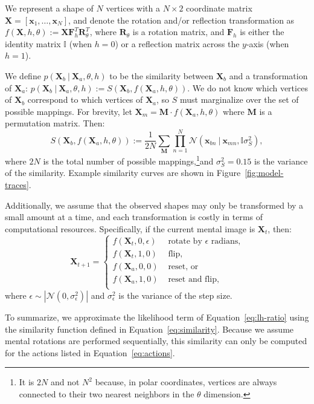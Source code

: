 \documentclass[10pt,letterpaper]{article}
\newcommand{\Xa}[0]{\mathbf{X}_a}
\newcommand{\Xb}[0]{\mathbf{X}_b}
\newcommand{\Xt}[0]{\mathbf{X}_t}
\newcommand{\R}[0]{\mathbf{R}_\theta}
\newcommand{\F}[0]{\mathbf{F}}
\newcommand{\M}[0]{\mathbf{M}}
\newcommand{\I}[0]{\mathbb{I}}
\newcommand{\hi}[0]{h=0}
\newcommand{\hf}[0]{h=1}
\begin{document}
We represent a shape of $N$ vertices with a $N\times 2$ coordinate
matrix $\mathbf{X}=[\mathbf{x}_1, \ldots{}, \mathbf{x}_N]$, and denote
the rotation and/or reflection transformation as $f(\mathbf{X}, h,
\theta):=\mathbf{X}\F_h^T\R^T$, where $\R$ is a rotation matrix, and
$\F_h$ is either the identity matrix $\I$ (when $\hi$) or a reflection
matrix across the $y$-axis (when $\hf$).

We define $p(\Xb\ \vert\ \Xa, \theta, h)$ to be the similarity between
$\Xb$ and a transformation of $\Xa$: $p(\Xb\ \vert\ \Xa, \theta, h):=
S(\Xb, f(\Xa, h, \theta))$.  We do not know which vertices of $\Xb$
correspond to which vertices of $\Xa$, so $S$ must marginalize over
the set of possible mappings. For brevity, let
$\mathbf{X}_m=\M\cdot{}f(\Xa, h, \theta)$ where $\M$ is a permutation
matrix. Then:
\begin{equation}
  S(\Xb, f(\Xa, h, \theta)):=\frac{1}{2N} \sum_{\M} \prod_{n=1}^N \mathcal{N}(\mathbf{x}_{bn}\ \vert \ \mathbf{x}_{mn}, \I\sigma_S^2),
  \label{eq:similarity}
\end{equation}
where $2N$ is the total number of possible mappings,\footnote{It is
  $2N$ and not $N^2$ because, in polar coordinates, vertices are
  always connected to their two nearest neighbors in the $\theta$
  dimension.}and $\sigma_S^2=0.15$ is the variance of the
similarity. Example similarity curves are shown in
Figure~\ref{fig:model-traces}.

Additionally, we assume that the observed shapes may only be
transformed by a small amount at a time, and each transformation is
costly in terms of computational resources. Specifically, if the
current mental image is $\Xt$, then:
\begin{equation}
  \mathbf{X}_{t+1} = \left\{ \begin{array}{ll}
      f(\Xt, 0, \epsilon) &\mbox{ rotate by $\epsilon$ radians,} \\
      f(\Xt, 1, 0) &\mbox{ flip,} \\
      f(\Xa, 0, 0) &\mbox{ reset, or} \\
      f(\Xa, 1, 0) &\mbox{ reset and flip,} \\
    \end{array} \right.
  \label{eq:actions}
\end{equation}
where $\epsilon\sim \left|\mathcal{N}(0, \sigma_\epsilon^2)\right|$
and $\sigma_\epsilon^2$ is the variance of the step size.

To summarize, we approximate the likelihood term of
Equation~\ref{eq:lh-ratio} using the similarity function defined in
Equation~\ref{eq:similarity}. Because we assume mental rotations are
performed sequentially, this similarity can only be computed for the
actions listed in Equation~\ref{eq:actions}.
\end{document}
